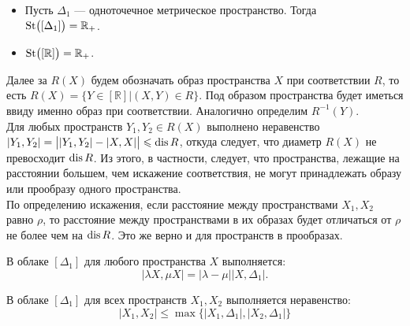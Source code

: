  	 \begin{itemize}
 	 	\item Пусть $\Delta_1$ --- одноточечное метрическое пространство.
Тогда\\ $\operatorname{St}\bigl([\Delta_1]\bigr) = \mathbb{R}_+$.
 	 	\item $\operatorname{St}\bigl([\mathbb{R}]\bigr) = \mathbb{R}_+ $.
 	 \end{itemize}   Далее
за $R(X)$ будем обозначать образ пространства $X$ при
соответствии $R$, то есть
$R(X) = \{Y \in [\mathbb{R}] | (X, Y) \in R\}$. Под образом пространства будет
иметься ввиду именно образ при соответствии.  Аналогично определим $R^{-1}(Y)$.
\\ Для любых пространств $Y_1, Y_2 \in R(X)$ выполнено неравенство
$|Y_1, Y_2| = \big| |Y_1,Y_2| - |X,X|\big| \leqslant \operatorname{dis} R$, откуда следует, что
диаметр  $R(X)$ не превосходит $\operatorname{dis} R$. Из этого, в частности, следует, что
пространства, лежащие на расстоянии большем, чем искажение соответствия, не
могут принадлежать образу или прообразу одного пространства.\\ По определению
искажения, если расстояние между пространствами $X_1, X_2$ равно $\rho$, то
расстояние между пространствами в их образах будет отличаться от $\rho$ не более
чем на $\operatorname{dis} R$. Это же верно и для пространств в прообразах.
 \begin{remark} В облаке $[\Delta_1]$ для любого пространства $X$ выполняется:
	$$|\lambda X, \mu X| = |\lambda - \mu||X,\Delta_1|.$$
 \end{remark}
 \begin{remark} В облаке $[\Delta_{1}]$ для всех пространств $X_{1}, X_{2}$
выполняется неравенство:
   $$|X_{1},X_{2}| \le \max\{|X_{1}, \Delta_{1}|,|X_{2},\Delta_{1}|\}$$
 \end{remark}
